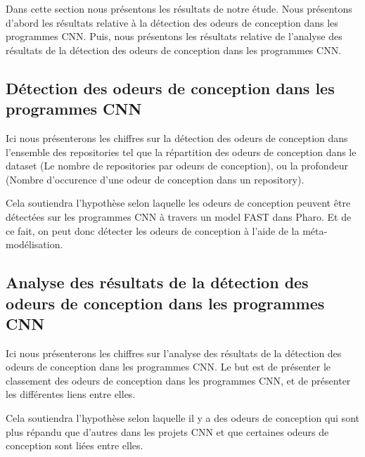 \label{sec:results}
Dans cette section nous présentons les résultats de notre étude. Nous présentons
d'abord les résultats relative à la détection des odeurs de conception dans les
programmes CNN. Puis, nous présentons les résultats relative de l'analyse des
résultats de la détection des odeurs de conception dans les programmes CNN.

\subsection{Détection des odeurs de conception dans les programmes CNN}
\label{sec:results1}
Ici nous présenterons les chiffres sur la détection des odeurs de conception
dans l'ensemble des repositories tel que la répartition des odeurs de
conception dans le dataset (Le nombre de repositories par odeurs de conception),
ou la profondeur (Nombre d'occurence d'une odeur de conception dans un
repository).


Cela soutiendra l'hypothèse selon laquelle les odeurs de conception peuvent être
détectées sur les programmes CNN à travers un model FAST dans Pharo. Et de ce
fait, on peut donc détecter les odeurs de conception à l'aide de la méta-modélisation.




\subsection{Analyse des résultats de la détection des odeurs de conception dans les programmes CNN}
\label{sec:results2}
Ici nous présenterons les chiffres sur l'analyse des résultats de la détection
des odeurs de conception dans les programmes CNN. Le but est de présenter le
classement des odeurs de conception dans les programmes CNN, et de présenter les
différentes liens entre elles.

Cela soutiendra l'hypothèse selon laquelle il y a des odeurs de conception qui sont plus répandu que d'autres dans
les projets CNN et que certaines odeurs de conception sont liées entre elles.

